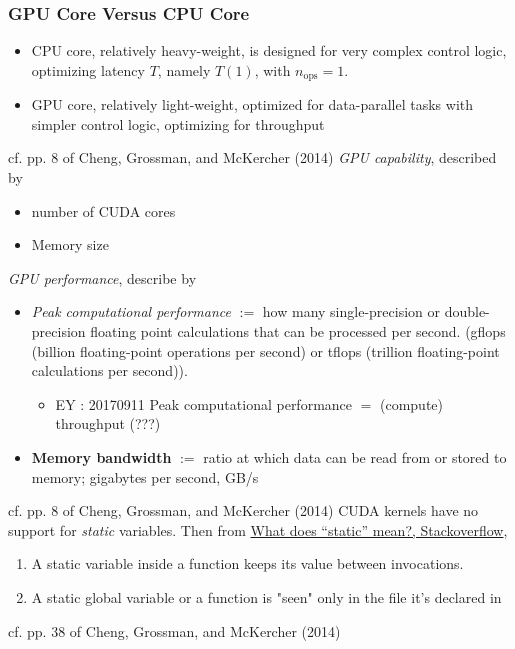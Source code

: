 \documentclass[10pt]{amsart}
\begin{document}
\begin{multicols*}{2}
\subsubsection{GPU Core Versus CPU Core}  
\begin{itemize}
	\item CPU core, relatively heavy-weight, is designed for very complex control logic, optimizing latency $T$, namely $T(1)$, with $n_{\text{ops}}=1$.  
	\item GPU core, relatively light-weight, optimized for data-parallel tasks with simpler control logic, optimizing for throughput   
\end{itemize}
cf. pp. 8 of Cheng, Grossman, and McKercher (2014) \cite{CGM2014}
\emph{GPU capability}, described by 
\begin{itemize}
	\item number of CUDA cores  
	\item Memory size
\end{itemize}
\emph{GPU performance}, describe by 
\begin{itemize}
	\item \emph{Peak computational performance} $:=$ how many single-precision or double-precision floating point calculations that can be processed per second.  (gflops (billion floating-point operations per second) or tflops (trillion floating-point calculations per second)).  
	\begin{itemize}
		\item EY : 20170911 Peak computational performance $=$ (compute) throughput (???)
	\end{itemize}
	\item \textbf{Memory bandwidth} $:=$ ratio at which data can be read from or stored to memory; gigabytes per second, GB/s
\end{itemize}
cf. pp. 8 of Cheng, Grossman, and McKercher (2014) \cite{CGM2014}
CUDA kernels have no support for \emph{static} variables.  
Then from \href{https://stackoverflow.com/questions/572547/what-does-static-mean}{What does “static” mean?, Stackoverflow}, 
\begin{enumerate}
	\item A static variable inside a function keeps its value between invocations. 
	\item A static global variable or a function is "seen" only in the file it's declared in
\end{enumerate}
cf. pp. 38 of Cheng, Grossman, and McKercher (2014) \cite{CGM2014}



\end{multicols*}
\end{document}

